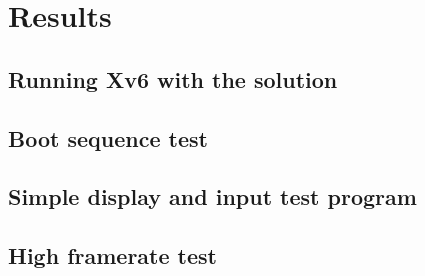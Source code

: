 \chapter{Results}
\label{chapter3}

\section{Running Xv6 with the solution}

\section{Boot sequence test}

\section{Simple display and input test program}

\section{High framerate test}
